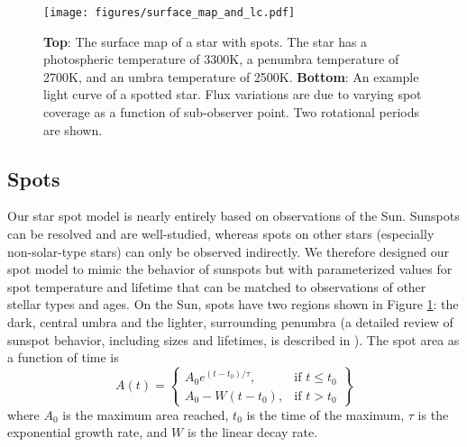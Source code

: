 \documentclass[linenumbers,preprint,authoryear]{elsarticle}
\begin{document}
\begin{figure}
    \centering
        \texttt{[image: figures/surface\_map\_and\_lc.pdf]}
    \caption{{\bf Top}: The surface map of a star with spots. The star has a photospheric temperature of 3300K, a penumbra temperature of 2700K, and an umbra temperature of 2500K.
    {\bf Bottom}: An example light curve of a spotted star. Flux variations are due to varying spot coverage as a function of sub-observer point. Two rotational periods are shown.
    }
    \label{fig:surface_map}
\end{figure}

\subsection{Spots \label{subsec:spots}}
Our star spot model is nearly entirely based on observations of the Sun. Sunspots can be resolved and are well-studied, whereas spots on other stars (especially non-solar-type stars) can only be observed indirectly. We therefore designed our spot model to mimic the behavior of sunspots but with parameterized values for spot temperature and lifetime that can be matched to observations of other stellar types and ages. On the Sun, spots have two regions shown in Figure \ref{fig:surface_map}: the dark, central umbra and the lighter, surrounding penumbra (a detailed review of sunspot behavior, including sizes and lifetimes, is described in \citet{solanki2003}). The spot area as a function of time is
\begin{equation}
    A(t) = \left\{
    \begin{array}{lr}
        A_0 e^{(t-t_0)/\tau}, & \text{if } t \leq t_0 \\
        A_0 - W(t-t_0), & \text{if } t > t_0
    \end{array}
    \right\}
\end{equation}
where $A_0$ is the maximum area reached, $t_0$ is the time of the maximum, $\tau$ is the exponential growth rate, and $W$ is the linear decay rate.
\end{document}
